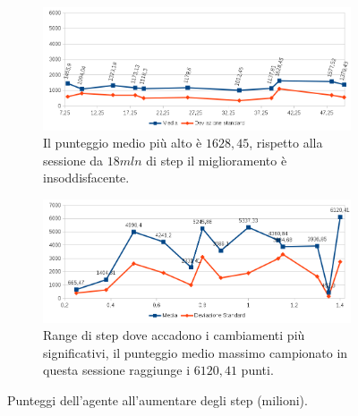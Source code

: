\documentclass[twoside,twocolumn,10pt]{extarticle}
\theoremstyle{definition}
\begin{document}
			\begin{figure}[h]
				\centering
				
				\begin{subfigure}[b]{\textwidth}
					\centering
					\includegraphics[scale=.75]{images/over7.png}
					\caption{Il punteggio medio più alto è $1628,45$, rispetto alla sessione da $18mln$ di step il miglioramento è insoddisfacente.}
					\label{subfig:under7}
				\end{subfigure}
				
				\begin{subfigure}[b]{\textwidth}
					\centering
					\includegraphics[scale=.75]{images/under7.png}
					\caption{Range di step dove accadono i cambiamenti più significativi, il punteggio medio massimo campionato in questa sessione raggiunge i $6120,41$ punti.}
					\label{subfig:over7}
				\end{subfigure}
			
				\caption{Punteggi dell'agente all'aumentare degli step (milioni).} 
				\label{fig:centipede-scores}
			\end{figure}
		
\end{document}
